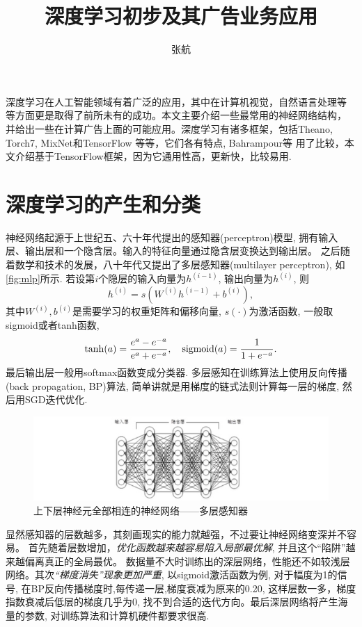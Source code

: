 \documentclass{ctexart}
\title{深度学习初步及其广告业务应用}
\author{张航}
\begin{document}
\maketitle
深度学习在人工智能领域有着广泛的应用，其中在计算机视觉，自然语言处理等
等方面更是取得了前所未有的成功。本文主要介绍一些最常用的神经网络结构，
并给出一些在计算广告上面的可能应用。深度学习有诸多框架，包括Theano, Torch7,
MixNet和TensorFlow 等等，它们各有特点, Bahrampour等 \cite{bahrampour2015comparative}
用了比较，本文介绍基于TensorFlow框架，因为它通用性高，更新快，比较易用.

\section{深度学习的产生和分类}
神经网络起源于上世纪五、六十年代提出的感知器(perceptron)模型, 拥有输入层、输出层和一个隐含层。输入的特征向量通过隐含层变换达到输出层。
之后随着数学和技术的发展，八十年代又提出了多层感知器(multilayer perceptron),
如\autoref{fig:mlp}所示. 若设第\(i\)个隐层的输入向量为\(h^{(i-1)}\),
输出向量为\(h^{(i)}\), 则
\[
  h^{(i)} = s(W^{(i)}h^{(i-1)}+b^{(i)}),
\]
其中\(W^{(i)},b^{(i)}\)是需要学习的权重矩阵和偏移向量, \(s(\cdot)\)为激活函数, 一般取sigmoid或者tanh函数,
\[
  \tanh(a)=\frac{e^a-e^{-a}}{e^a+e^{-a}},\quad \operatorname*{sigmoid}(a)=\frac{1}{1+e^{-a}}.
\]
最后输出层一般用softmax函数变成分类器. 
多层感知在训练算法上使用反向传播(back propagation, BP)算法,
简单讲就是用梯度的链式法则计算每一层的梯度, 然后用SGD迭代优化.
\begin{figure}[htb]
  \centering
  \includegraphics[width=\textwidth]{mlp}
  \caption{上下层神经元全部相连的神经网络——多层感知器}
  \label{fig:mlp}
\end{figure}

显然感知器的层数越多，其刻画现实的能力就越强，不过要让神经网络变深并不容易。
首先随着层数增加，\emph{优化函数越来越容易陷入局部最优解}, 并且这个“陷阱”越来越偏离真正的全局最优。
数据量不大时训练出的深层网络，性能还不如较浅层网络。其次\emph{“梯度消失”现象更加严重},
以sigmoid激活函数为例, 对于幅度为1的信号, 在BP反向传播梯度时,每传递一层,梯度衰减为原来的0.20,
这样层数一多，梯度指数衰减后低层的梯度几乎为0,
找不到合适的迭代方向。最后深层网络将产生海量的参数,
对训练算法和计算机硬件都要求很高.
\end{document}
